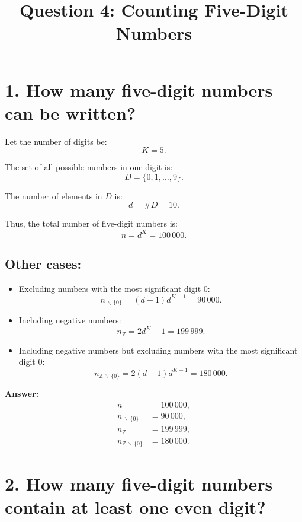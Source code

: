 \documentclass[12pt]{article}
\title{Question 4: Counting Five-Digit Numbers}
\author{}
\date{}
\begin{document}
\maketitle
\onehalfspacing

\section*{1. How many five-digit numbers can be written?}

Let the number of digits be:
\[
K = 5.
\]

The set of all possible numbers in one digit is:
\[
D = \{0,1,\dots,9\}.
\]

The number of elements in \( D \) is:
\[
d = \#D = 10.
\]

Thus, the total number of five-digit numbers is:
\[
n = d^K = 100\,000.
\]

\subsection*{Other cases:}

\begin{itemize}
    \item Excluding numbers with the most significant digit 0:
    \[
    n_{\,\backslash\,\{0\}} = (d-1)d^{K-1} = 90\,000.
    \]
    
    \item Including negative numbers:
    \[
    n_{\mathbb{Z}} = 2d^K - 1 = 199\,999.
    \]
    
    \item Including negative numbers but excluding numbers with the most significant digit 0:
    \[
    n_{\mathbb{Z}\,\backslash\,\{0\}} = 2(d-1)d^{K-1} = 180\,000.
    \]
\end{itemize}

\textbf{Answer:}
\[
\begin{aligned}
n &= 100\,000, \\
n_{\,\backslash\,\{0\}} &= 90\,000, \\
n_{\mathbb{Z}} &= 199\,999, \\
n_{\mathbb{Z}\,\backslash\,\{0\}} &= 180\,000.
\end{aligned}
\]

\bigskip

\section*{2. How many five-digit numbers contain at least one even digit?}
\end{document}
